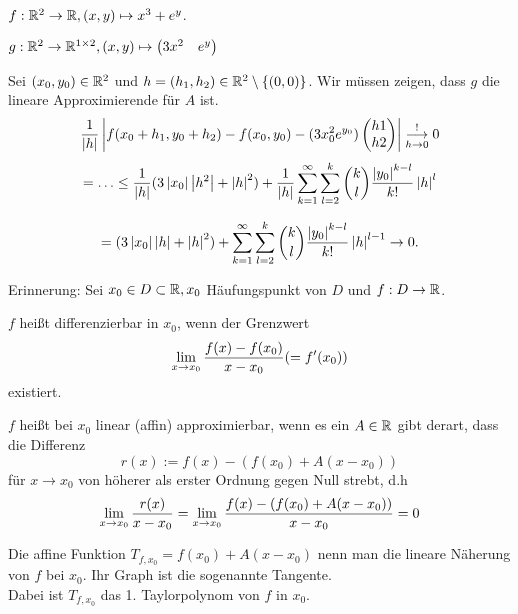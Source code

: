 \documentclass[../ana2u.tex]{subfiles}
\begin{document}
\begin{bsp}
    \( f:\mathbb{R}^2\rightarrow \mathbb{R}, (x,y) \mapsto x^3 + e^y \).
    \begin{beh}
        \( g:\mathbb{R}^2\rightarrow \mathbb{R}^{1\times 2}, (x,y) \mapsto \begin{pmatrix}
            3x^2 & e^y
        \end{pmatrix} \)
    \end{beh}
    \begin{bew}
        Sei \( (x_0, y_0) \in \mathbb{R}^2 \) und 
        \( h = (h_1, h_2) \in \mathbb{R}^2 \setminus \{(0,0)\} \).
        Wir müssen zeigen, dass \( g \) die lineare Approximierende 
        für \(A\) ist.
        \[ \frac{1}{\left|h\right|} \left|f(x_0 + h_1, y_0 + h_2) - f(x_0, y_0) - (3x_0^2 e^{y_0})\begin{pmatrix}
            h1 \\
            h2
        \end{pmatrix}\right| \overset{!}{\underset{h \rightarrow 0}{\longrightarrow}} 0 \]
        \[ = \ldots 
        \leq \frac{1}{\left|h\right|} (3 \left|x_0\right| \left|h^2\right| + \left|h\right|^2) 
        + \frac{1}{\left|h\right|} \sum_{k=1}^\infty \sum_{l=2}^k \binom{k}{l} 
        \frac{\left| y_0 \right|^{k-l}}{k!} \left|h\right|^l \]

        \[ = (3\left|x_0\right|\left|h\right| + \left|h\right|^2) + 
        \sum_{k=1}^\infty \sum_{l=2}^k \binom{k}{l} 
        \frac{\left| y_0 \right|^{k-l}}{k!} \left|h\right|^{l-1} \rightarrow 0. \]
    \end{bew}
\end{bsp}
Erinnerung:
Sei \(x_0 \in D \subset \mathbb{R}, x_0 \) Häufungspunkt von \(D\) und \(f:D\rightarrow \mathbb{R}\).
\begin{defi*}
    \(f\) heißt differenzierbar in \(x_0\), wenn der Grenzwert
    \[ \lim\limits_{x\rightarrow{}x_0} \frac{f(x)-f(x_0)}{x-x_0} (= f'(x_0)) \]
    existiert.
\end{defi*}
\begin{defi*}
    \(f\) heißt bei \(x_0\) linear (affin) approximierbar, wenn es ein
    \(A \in \mathbb{R}\) gibt derart, dass die Differenz
    \[ r(x) := f(x) - (f(x_0) + A(x-x_0)) \]
    für \(x \rightarrow x_0\)
    von höherer als erster Ordnung gegen Null strebt, d.h
    \[ \lim\limits_{x\rightarrow{}x_0} \frac{r(x)}{x-x_0} 
    = \lim\limits_{x\rightarrow{}x_0} \frac{f(x) - (f(x_0) + A(x-x_0))}{x-x_0} = 0 \]
\end{defi*}
Die affine Funktion \( T_{f,x_0} = f(x_0) + A(x - x_0) \) 
nenn man die lineare Näherung von \(f\) bei \(x_0\). Ihr 
Graph ist die sogenannte Tangente. \\
Dabei ist \(T_{f,x_0}\) das 1. Taylorpolynom von \(f\) in \(x_0\).\\
\end{document}
